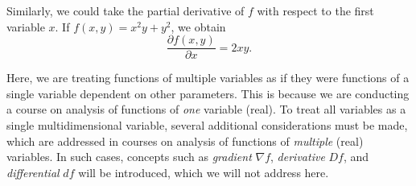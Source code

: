 Similarly, we could take the partial derivative of $f$ with respect to the first
variable $x$. If $f(x,y) = x^2y+y^2$, we obtain
\[
\frac{\partial f(x,y)}{\partial x} = 2xy.
\]

Here, we are treating functions of multiple variables as if they were functions
of a single variable dependent on other parameters. This is because we are
conducting a course on analysis of functions of \emph{one} variable (real).
%
%
%
To treat all variables as a single multidimensional variable, several additional
considerations must be made, which are addressed in courses on analysis of
functions of \emph{multiple}
%
%
%
(real) variables. In such cases, concepts such as \emph{gradient} $\nabla f$,
\emph{derivative} $Df$, and \emph{differential} $df$ will be introduced, which
we will not address here.